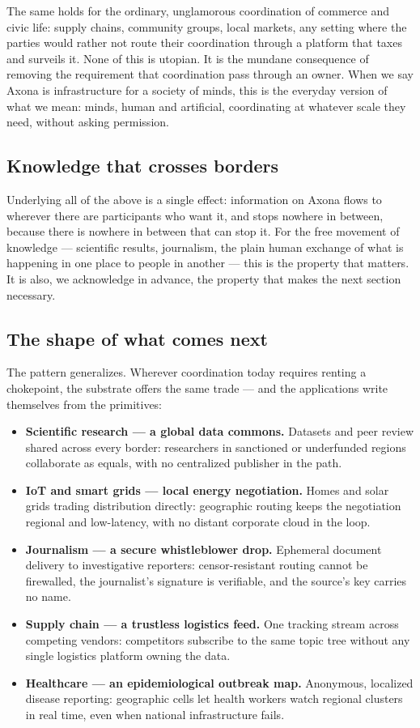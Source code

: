 \documentclass[nobib,justified]{tufte-handout}
\begin{document}
The same holds for the ordinary, unglamorous coordination of commerce and civic
life: supply chains, community groups, local markets, any setting where the
parties would rather not route their coordination through a platform that taxes
and surveils it. None of this is utopian. It is the mundane consequence of
removing the requirement that coordination pass through an owner. When we say
Axona is infrastructure for a society of minds, this is the everyday version of
what we mean: minds, human and artificial, coordinating at whatever scale they
need, without asking permission.

\subsection{Knowledge that crosses borders}

Underlying all of the above is a single effect: information on Axona flows to
wherever there are participants who want it, and stops nowhere in between,
because there is nowhere in between that can stop it. For the free movement of
knowledge --- scientific results, journalism, the plain human exchange of what is
happening in one place to people in another --- this is the property that
matters. It is also, we acknowledge in advance, the property that makes the next
section necessary.


\subsection{The shape of what comes next}

The pattern generalizes. Wherever coordination today requires renting a chokepoint, the substrate offers the same trade --- and the applications write themselves from the primitives:

\begin{itemize}
\item \textbf{Scientific research --- a global data commons.} Datasets and peer review shared across every border: researchers in sanctioned or underfunded regions collaborate as equals, with no centralized publisher in the path.
\item \textbf{IoT and smart grids --- local energy negotiation.} Homes and solar grids trading distribution directly: geographic routing keeps the negotiation regional and low-latency, with no distant corporate cloud in the loop.
\item \textbf{Journalism --- a secure whistleblower drop.} Ephemeral document delivery to investigative reporters: censor-resistant routing cannot be firewalled, the journalist's signature is verifiable, and the source's key carries no name.
\item \textbf{Supply chain --- a trustless logistics feed.} One tracking stream across competing vendors: competitors subscribe to the same topic tree without any single logistics platform owning the data.
\item \textbf{Healthcare --- an epidemiological outbreak map.} Anonymous, localized disease reporting: geographic cells let health workers watch regional clusters in real time, even when national infrastructure fails.
\end{itemize}
\end{document}
